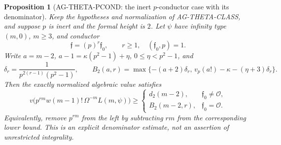 \documentclass[11pt,a4paper]{article}
\newtheorem{proposition}{Proposition}
\begin{document}
\begin{proposition}[AG-THETA-PCOND: the inert $p$-conductor case with its denominator]
Keep the hypotheses and normalization of AG-THETA-CLASS, and
suppose $p$ is inert and the formal height is $2$.
Let $\psi$ have infinity type $(m,0)$, $m\ge3$, and conductor
\[
 \mathfrak f=(p)^r\mathfrak f_0,\qquad r\ge1,
 \quad(\mathfrak f_0,p)=1.
\]
Write $a=m-2$, $a-1=\kappa(p^2-1)+\eta$,
$0\le\eta<p^2-1$, and
\[
 \delta_r=\frac1{p^{2(r-1)}(p^2-1)},\qquad
 B_2(a,r)=\max\{-(a+2)\delta_r,\,
       v_p(a!)-\kappa-(\eta+3)\delta_r\}.
\]
Then the exactly normalized algebraic value satisfies
\begin{equation}\label{eq:ag-cm-p-conductor-bound}
 v\bigl(p^{rm}w(m-1)!\,\Omega^{-m}L(m,\psi)\bigr)
 \ge
 \begin{cases}
 d_2(m-2),&\mathfrak f_0\ne\mathcal O,\\
 B_2(m-2,r),&\mathfrak f_0=\mathcal O.
 \end{cases}
\end{equation}
Equivalently, remove $p^{rm}$ from the left by subtracting
$rm$ from the corresponding lower bound. This is an explicit
denominator estimate, not an assertion of unrestricted integrality.
\end{proposition}
\end{document}
